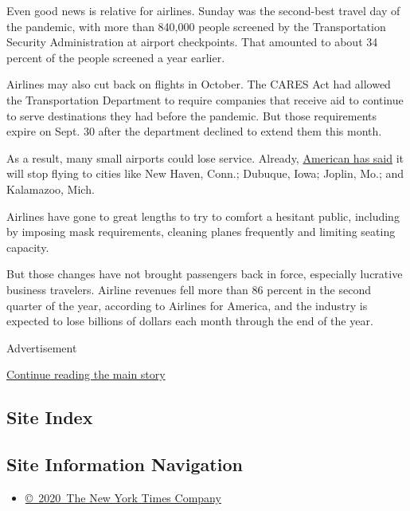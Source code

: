 Even good news is relative for airlines. Sunday was the second-best
travel day of the pandemic, with more than 840,000 people screened by
the Transportation Security Administration at airport checkpoints. That
amounted to about 34 percent of the people screened a year earlier.

Airlines may also cut back on flights in October. The CARES Act had
allowed the Transportation Department to require companies that receive
aid to continue to serve destinations they had before the pandemic. But
those requirements expire on Sept. 30 after the department declined to
extend them this month.

As a result, many small airports could lose service. Already,
\href{https://www.nytimes3xbfgragh.onion/live/2020/08/20/business/stock-market-today-coronavirus\#american-airlines-to-stop-flights-to-15-cities-after-government-aid-ends}{American
has said} it will stop flying to cities like New Haven, Conn.; Dubuque,
Iowa; Joplin, Mo.; and Kalamazoo, Mich.

Airlines have gone to great lengths to try to comfort a hesitant public,
including by imposing mask requirements, cleaning planes frequently and
limiting seating capacity.

But those changes have not brought passengers back in force, especially
lucrative business travelers. Airline revenues fell more than 86 percent
in the second quarter of the year, according to Airlines for America,
and the industry is expected to lose billions of dollars each month
through the end of the year.

Advertisement

\protect\hyperlink{after-bottom}{Continue reading the main story}

\hypertarget{site-index}{%
\subsection{Site Index}\label{site-index}}

\hypertarget{site-information-navigation}{%
\subsection{Site Information
Navigation}\label{site-information-navigation}}

\begin{itemize}
\tightlist
\item
  \href{https://help.nytimes3xbfgragh.onion/hc/en-us/articles/115014792127-Copyright-notice}{©~2020~The
  New York Times Company}
\end{itemize}

